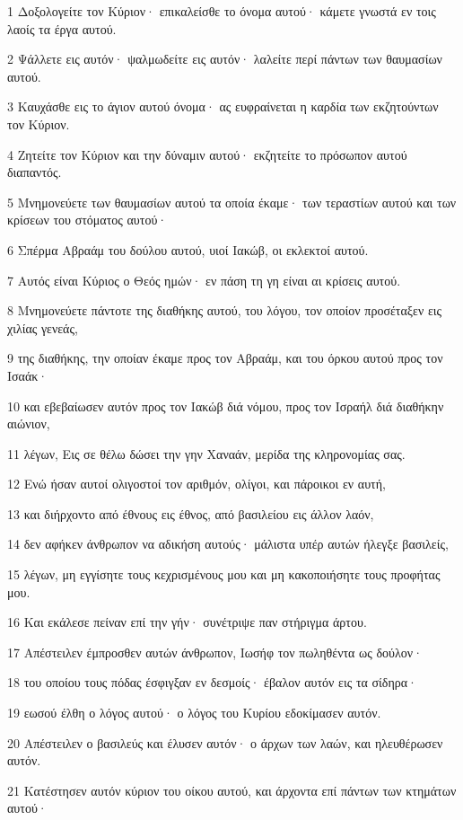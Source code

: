 \par 1 Δοξολογείτε τον Κύριον· επικαλείσθε το όνομα αυτού· κάμετε γνωστά εν τοις λαοίς τα έργα αυτού.
\par 2 Ψάλλετε εις αυτόν· ψαλμωδείτε εις αυτόν· λαλείτε περί πάντων των θαυμασίων αυτού.
\par 3 Καυχάσθε εις το άγιον αυτού όνομα· ας ευφραίνεται η καρδία των εκζητούντων τον Κύριον.
\par 4 Ζητείτε τον Κύριον και την δύναμιν αυτού· εκζητείτε το πρόσωπον αυτού διαπαντός.
\par 5 Μνημονεύετε των θαυμασίων αυτού τα οποία έκαμε· των τεραστίων αυτού και των κρίσεων του στόματος αυτού·
\par 6 Σπέρμα Αβραάμ του δούλου αυτού, υιοί Ιακώβ, οι εκλεκτοί αυτού.
\par 7 Αυτός είναι Κύριος ο Θεός ημών· εν πάση τη γη είναι αι κρίσεις αυτού.
\par 8 Μνημονεύετε πάντοτε της διαθήκης αυτού, του λόγου, τον οποίον προσέταξεν εις χιλίας γενεάς,
\par 9 της διαθήκης, την οποίαν έκαμε προς τον Αβραάμ, και του όρκου αυτού προς τον Ισαάκ·
\par 10 και εβεβαίωσεν αυτόν προς τον Ιακώβ διά νόμου, προς τον Ισραήλ διά διαθήκην αιώνιον,
\par 11 λέγων, Εις σε θέλω δώσει την γην Χαναάν, μερίδα της κληρονομίας σας.
\par 12 Ενώ ήσαν αυτοί ολιγοστοί τον αριθμόν, ολίγοι, και πάροικοι εν αυτή,
\par 13 και διήρχοντο από έθνους εις έθνος, από βασιλείου εις άλλον λαόν,
\par 14 δεν αφήκεν άνθρωπον να αδικήση αυτούς· μάλιστα υπέρ αυτών ήλεγξε βασιλείς,
\par 15 λέγων, μη εγγίσητε τους κεχρισμένους μου και μη κακοποιήσητε τους προφήτας μου.
\par 16 Και εκάλεσε πείναν επί την γήν· συνέτριψε παν στήριγμα άρτου.
\par 17 Απέστειλεν έμπροσθεν αυτών άνθρωπον, Ιωσήφ τον πωληθέντα ως δούλον·
\par 18 του οποίου τους πόδας έσφιγξαν εν δεσμοίς· έβαλον αυτόν εις τα σίδηρα·
\par 19 εωσού έλθη ο λόγος αυτού· ο λόγος του Κυρίου εδοκίμασεν αυτόν.
\par 20 Απέστειλεν ο βασιλεύς και έλυσεν αυτόν· ο άρχων των λαών, και ηλευθέρωσεν αυτόν.
\par 21 Κατέστησεν αυτόν κύριον του οίκου αυτού, και άρχοντα επί πάντων των κτημάτων αυτού·
